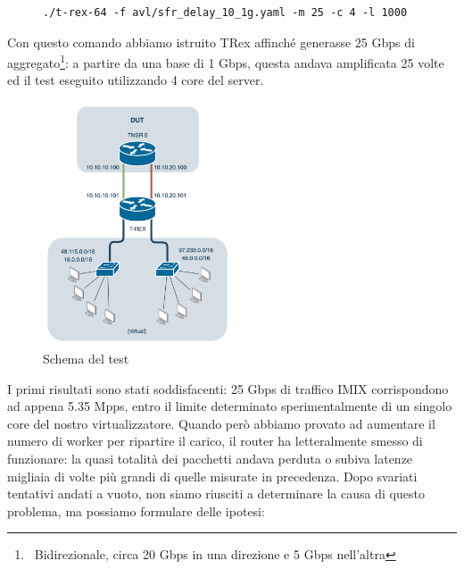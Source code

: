 \begin{figure}[h!]
\centering
\begin{BVerbatim}
./t-rex-64 -f avl/sfr_delay_10_1g.yaml -m 25 -c 4 -l 1000
\end{BVerbatim}
\end{figure}

Con questo comando abbiamo istruito TRex affinché generasse 25 Gbps di  aggregato\footnote{\ Bidirezionale, circa 20 Gbps in una direzione e 5 Gbps nell'altra}: a partire da una base di 1 Gbps, questa andava amplificata 25 volte ed il test eseguito utilizzando 4 core del server.

\begin{figure}[htb]
    \includegraphics[width=0.5\textwidth]{graphics/trex-tnsr-dut.png}
    \caption{Schema del test}
    \label{fig:trex-tnsr-dut}
\end{figure}

I primi risultati sono stati soddisfacenti: 25 Gbps di traffico IMIX corrispondono ad appena 5.35 Mpps, entro il limite determinato sperimentalmente di un singolo core del nostro virtualizzatore. Quando però abbiamo provato ad aumentare il numero di worker per ripartire il carico, il router ha letteralmente smesso di funzionare: la quasi totalità dei pacchetti andava perduta o subiva latenze migliaia di volte più grandi di quelle misurate in precedenza. Dopo svariati tentativi andati a vuoto, non siamo riusciti a determinare la causa di questo problema, ma possiamo formulare delle ipotesi:


